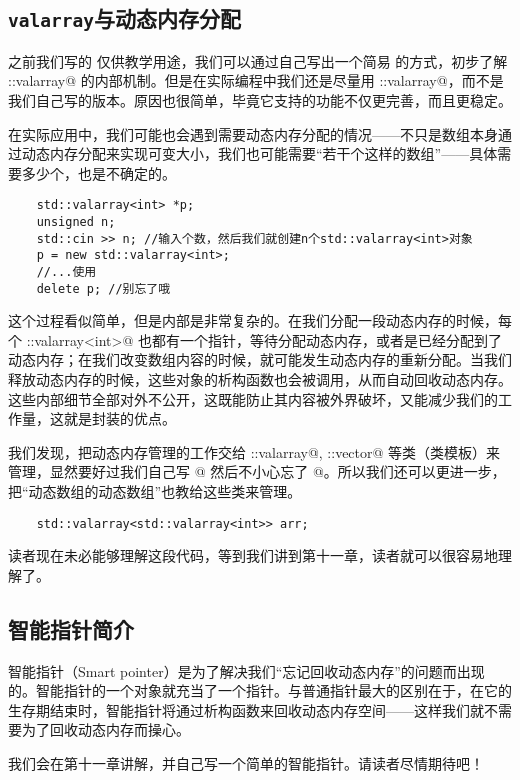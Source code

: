 \subsection*{\texttt{valarray}与动态内存分配}
之前我们写的 \lstinline@valarri@ 仅供教学用途，我们可以通过自己写出一个简易 \lstinline@valarri@ 的方式，初步了解 \lstinline@std::valarray@ 的内部机制。但是在实际编程中我们还是尽量用 \lstinline@std::valarray@，而不是我们自己写的版本。原因也很简单，毕竟它支持的功能不仅更完善，而且更稳定。\par
在实际应用中，我们可能也会遇到需要动态内存分配的情况——不只是数组本身通过动态内存分配来实现可变大小，我们也可能需要``若干个这样的数组''——具体需要多少个，也是不确定的。
\begin{lstlisting}
    std::valarray<int> *p;
    unsigned n;
    std::cin >> n; //输入个数，然后我们就创建n个std::valarray<int>对象
    p = new std::valarray<int>;
    //...使用
    delete p; //别忘了哦
\end{lstlisting}
这个过程看似简单，但是内部是非常复杂的。在我们分配一段动态内存的时候，每个 \lstinline@std::valarray<int>@ 也都有一个指针，等待分配动态内存，或者是已经分配到了动态内存；在我们改变数组内容的时候，就可能发生动态内存的重新分配。当我们释放动态内存的时候，这些对象的析构函数也会被调用，从而自动回收动态内存。这些内部细节全部对外不公开，这既能防止其内容被外界破坏，又能减少我们的工作量，这就是封装的优点。\par
我们发现，把动态内存管理的工作交给 \lstinline@std::valarray@, \lstinline@std::vector@ 等类（类模板）来管理，显然要好过我们自己写 \lstinline@new[]@ 然后不小心忘了 \lstinline@delete[]@。所以我们还可以更进一步，把``动态数组的动态数组''也教给这些类来管理。
\begin{lstlisting}
    std::valarray<std::valarray<int>> arr;
\end{lstlisting}
读者现在未必能够理解这段代码，等到我们讲到第十一章，读者就可以很容易地理解了。\par
\subsection*{智能指针简介}
智能指针（Smart pointer）是为了解决我们``忘记回收动态内存''的问题而出现的。智能指针的一个对象就充当了一个指针。与普通指针最大的区别在于，在它的生存期结束时，智能指针将通过析构函数来回收动态内存空间——这样我们就不需要为了回收动态内存而操心。\par
我们会在第十一章讲解，并自己写一个简单的智能指针。请读者尽情期待吧！\par
